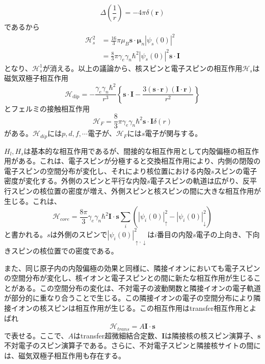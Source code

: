 \documentclass[11pt,a4j]{jreport}
\begin{document}
\begin{equation}
  \Delta \left(\frac{1}{r}\right)=-4\pi\delta(\bm{r})
\end{equation}
であるから
\begin{align}
  \mathcal{H}_s^2&=\frac{16}{3}\pi \mu_B \bm{s}\cdot\bm{\mu}_n|\psi_s(0)|^2\\
  &=\frac{8}{3}\pi \gamma_e\gamma_n\hbar^2|\psi_s(0)|^2\bm{s}\cdot\bm{I}
\end{align}
となり、$\mathcal{H}_s^1$が消える。以上の議論から、核スピンと電子スピンの相互作用$\mathcal{H}_s$は磁気双極子相互作用
\begin{equation}
  \mathcal{H}_{\text{dip}} = -\frac{\gamma_e \gamma_n \hbar^2}{r^3} \left\{ \bm{s} \cdot \bm{I} - \frac{3 (\bm{s} \cdot \bm{r}) (\bm{I} \cdot \bm{r})}{r^2} \right\}
  \label{H_dip}
\end{equation}
とフェルミの接触相互作用
\begin{equation}
  \mathcal{H}_F=\frac{8}{3}\pi\gamma_e\gamma_n\hbar^2\bm{s}\cdot \bm{I}\delta(r)
  \label{H_F}
\end{equation}
がある。$\mathcal{H}_{dip}$には$p,d,f,\cdots$電子が、$\mathcal{H}_F$には$s$電子が関与する。\par
$H_l,H_s$は基本的な相互作用であるが、間接的な相互作用として内殻偏極の相互作用がある。これは、電子スピンが分極すると交換相互作用により、内側の閉殻の電子スピンの空間分布が変化し、それにより核位置における内殻$s$スピンの電子密度が変化する。外側のスピンと平行な内殻$s$電子スピンの軌道は広がり、反平行スピンの核位置の密度が増え、外側スピンと核スピンの間に大きな相互作用が生じる。これは、
\begin{equation}
\mathcal{H}_{core}=\frac{8\pi}{3}\gamma_e\gamma_n\hbar^2\bm{I}\cdot\bm{s}\sum_{i}{(|\psi_i(0)|_\uparrow^2-|\psi_i(0)|_\downarrow^2 )}
\label{H_core}
\end{equation}
と書かれる。$s$は外側のスピンで$|\psi_i(0)|_{\uparrow,\downarrow }^2$は$i$番目の内殻$s$電子の上向き、下向きスピンの核位置での密度である。\par
また、同じ原子内の内殻偏極の効果と同様に、隣接イオンにおいても電子スピンの空間分布が変化し、核イオンと電子スピンとの間に新たな相互作用が生じることがある。この空間分布の変化は、不対電子の波動関数と隣接イオンの電子軌道が部分的に重なり合うことで生じる。この隣接イオンの電子の空間分布により隣接イオンの核スピンは相互作用が生じる。この相互作用はtransfer相互作用とよばれ
\begin{equation}
\mathcal{H}_{trans} = A\bm{I}\cdot\bm{s}
\end{equation}
で表せる。ここで、$A$はtransfer超微細結合定数、$\bm I$は隣接核の核スピン演算子、$\bm s$不対電子のスピン演算子である。さらに、不対電子スピンと隣接核サイトの間には、磁気双極子相互作用も存在する。\par
\end{document}
